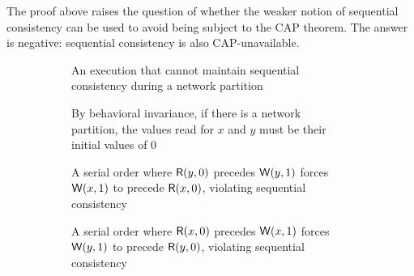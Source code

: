 \documentclass[]             %
{NASA}                       %
\theoremstyle{definition}
\begin{document}
The proof above raises the question of whether the weaker notion of
sequential consistency can be used to avoid being subject to the CAP
theorem. The answer is negative: sequential consistency is also
CAP-unavailable.

\begin{figure}[p]
  \setlength\belowcaptionskip{5ex}
  \begin{subfigure}{1\textwidth}
    \centering
  
  \caption{An execution that cannot maintain sequential consistency during a network partition}
  \label{fig:dsm-cap-example-2}
  \end{subfigure}
  \begin{subfigure}{1\textwidth}
    \centering
    
    \caption{By behavioral invariance, if there is a network partition, the values read for $x$ and $y$ must be their initial values of $0$}
    \label{fig:dsm-cap-example-2-results}
  \end{subfigure}
  \begin{subfigure}{1\textwidth}
    \centering
    
    \caption{A serial order where $\mathsf{R}\!\left(y, 0\right)$ precedes $\mathsf{W}\!\left(y, 1\right)$ forces $\mathsf{W}\!\left(x, 1\right)$ to precede $\mathsf{R}\!\left(x, 0\right)$, violating sequential consistency}
    \label{fig:dsm-cap-example-2-serial1}
  \end{subfigure}
  \begin{subfigure}{1\textwidth}
    \centering
    
    \caption{A serial order where $\mathsf{R}\!\left(x, 0\right)$ precedes $\mathsf{W}\!\left(x, 1\right)$ forces $\mathsf{W}\!\left(y, 1\right)$ to precede $\mathsf{R}\!\left(y, 0\right)$, violating sequential consistency}
    \label{fig:dsm-cap-example-2-serial2}
  \end{subfigure}
  \caption{}
  \label{}
\end{figure}
\end{document}
